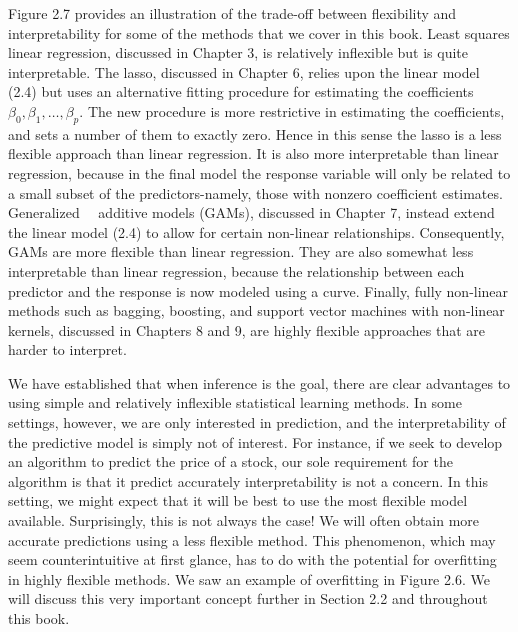 \documentclass[10pt]{article}
\begin{document}
Figure 2.7 provides an illustration of the trade-off between flexibility and interpretability for some of the methods that we cover in this book. Least squares linear regression, discussed in Chapter 3, is relatively inflexible but is quite interpretable. The lasso, discussed in Chapter 6, relies upon the linear model (2.4) but uses an alternative fitting procedure for estimating the coefficients $\beta_{0}, \beta_{1}, \ldots, \beta_{p}$. The new procedure is more restrictive in estimating the coefficients, and sets a number of them to exactly zero. Hence in this sense the lasso is a less flexible approach than linear regression. It is also more interpretable than linear regression, because in the final model the response variable will only be related to a small subset of the predictors-namely, those with nonzero coefficient estimates. Generalized\
\
additive models (GAMs), discussed in Chapter 7, instead extend the linear model (2.4) to allow for certain non-linear relationships. Consequently, GAMs are more flexible than linear regression. They are also somewhat less interpretable than linear regression, because the relationship between each predictor and the response is now modeled using a curve. Finally, fully non-linear methods such as bagging, boosting, and support vector machines with non-linear kernels, discussed in Chapters 8 and 9, are highly flexible approaches that are harder to interpret.

We have established that when inference is the goal, there are clear advantages to using simple and relatively inflexible statistical learning methods. In some settings, however, we are only interested in prediction, and the interpretability of the predictive model is simply not of interest. For instance, if we seek to develop an algorithm to predict the price of a stock, our sole requirement for the algorithm is that it predict accurately interpretability is not a concern. In this setting, we might expect that it will be best to use the most flexible model available. Surprisingly, this is not always the case! We will often obtain more accurate predictions using a less flexible method. This phenomenon, which may seem counterintuitive at first glance, has to do with the potential for overfitting in highly flexible methods. We saw an example of overfitting in Figure 2.6. We will discuss this very important concept further in Section 2.2 and throughout this book.
\end{document}
